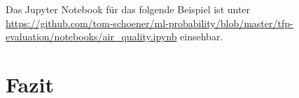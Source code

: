 \documentclass[12pt]{article}
\begin{document}
Das Jupyter Notebook für das folgende Beispiel ist unter \url{https://github.com/tom-schoener/ml-probability/blob/master/tfp-evaluation/notebooks/air_quality.ipynb} einsehbar.



\section{Fazit}


\newpage



\listoffigures
\lstlistoflistings
\end{document}
